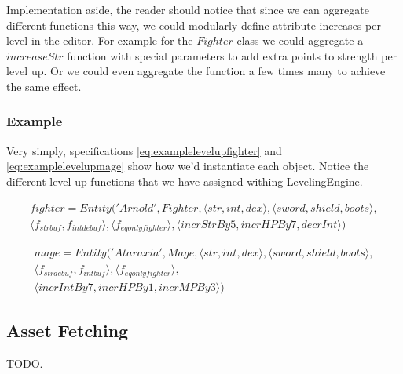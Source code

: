 Implementation aside, the reader should notice that since we can aggregate
different functions this way, we could modularly define attribute increases per
level in the editor. For example for the $Fighter$ class we could aggregate a
$increaseStr$ function with special parameters to add extra points to strength
per level up. Or we could even aggregate the function a few times many to
achieve the same effect.

\subsubsection{Example}

Very simply, specifications \ref{eq:examplelevelupfighter} and
\ref{eq:examplelevelupmage} show how we'd instantiate each object. Notice the
different level-up functions that we have assigned withing LevelingEngine.

\begin{equation}
\begin{split}
  \label{eq:examplelevelupfighter}
  fighter = Entity('Arnold', Fighter, \langle str, int, dex \rangle, \langle sword, shield, boots \rangle, \\
    \langle f_{strbuf}, f_{intdebuf} \rangle,
    \langle f_{eqonlyfighter} \rangle, \langle incrStrBy5, incrHPBy7, decrInt \rangle)
\end{split}
\end{equation}

\begin{equation}
\begin{split}
  \label{eq:examplelevelupmage}
  mage = Entity('Ataraxia', Mage, \langle str, int, dex \rangle, \langle sword, shield, boots \rangle, \\
    \langle f_{strdebuf}, f_{intbuf} \rangle, \langle f_{eqonlyfighter} \rangle, \\
  \langle incrIntBy7, incrHPBy1, incrMPBy3 \rangle)
\end{split}
\end{equation}

\subsection{Asset Fetching} \label{sec:asset-fetch}

TODO.

